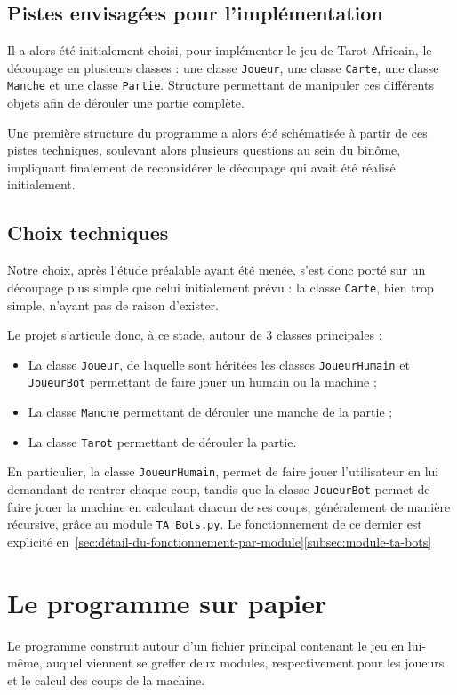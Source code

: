    \subsection{Pistes envisagées pour l'implémentation}\label{subsec:pistes-envisagées-pour-l'implémentation}
      Il a alors été initialement choisi, pour implémenter le jeu de Tarot Africain, le découpage en plusieurs classes : une classe \texttt{Joueur}, une classe \texttt{Carte}, une classe \texttt{Manche} et une classe \texttt{Partie}.
      Structure permettant de manipuler ces différents objets afin de dérouler une partie complète.

      Une première structure du programme a alors été schématisée à partir de ces pistes techniques, soulevant alors plusieurs questions au sein du binôme, impliquant finalement de reconsidérer le découpage qui avait été réalisé initialement.

   \subsection{Choix techniques}\label{subsec:choix-techniques}
      Notre choix, après l'étude préalable ayant été menée, s'est donc porté sur un découpage plus simple que celui initialement prévu : la classe \texttt{Carte}, bien trop simple, n'ayant pas de raison d'exister.

      Le projet s'articule donc, à ce stade, autour de 3 classes principales :
      \begin{itemize}
         \item La classe \texttt{Joueur}, de laquelle sont héritées les classes \texttt{JoueurHumain} et \texttt{JoueurBot} permettant de faire jouer un humain ou la machine ;
         \item La classe \texttt{Manche} permettant de dérouler une manche de la partie ;
         \item La classe \texttt{Tarot} permettant de dérouler la partie.
      \end{itemize}

      En particulier, la classe \texttt{JoueurHumain}, permet de faire jouer l'utilisateur en lui demandant de rentrer chaque coup, tandis que la classe \texttt{JoueurBot} permet de faire jouer la machine en calculant chacun de ses coups, généralement de manière récursive, grâce au module \texttt{TA\_Bots.py}.
      Le fonctionnement de ce dernier est explicité en~\ref{sec:détail-du-fonctionnement-par-module}\ref{subsec:module-ta-bots}


\section{Le programme sur papier}\label{sec:le-programme-sur-papier}
   Le programme construit autour d'un fichier principal contenant le jeu en lui-même, auquel viennent se greffer deux modules, respectivement pour les joueurs et le calcul des coups de la machine.

